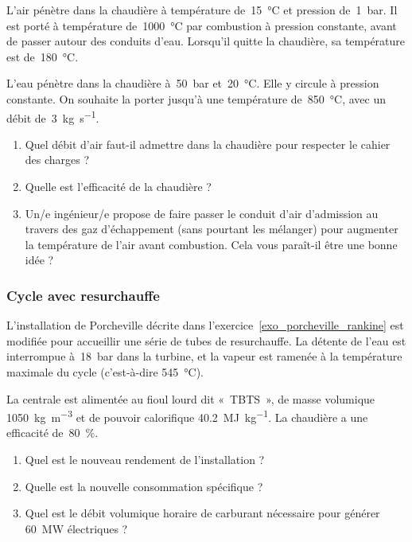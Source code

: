 	L’air pénètre dans la chaudière à température de~\SI{15}{\degreeCelsius} et pression de~\SI{1}{\bar}. Il est porté à température de~\SI{1000}{\degreeCelsius} par combustion à pression constante, avant de passer autour des conduits d’eau.	Lorsqu’il quitte la chaudière, sa température est de~\SI{180}{\degreeCelsius}.

	L’eau pénètre dans la chaudière à~\SI{50}{\bar} et~\SI{20}{\degreeCelsius}. Elle y circule à pression constante. On souhaite la porter jusqu’à une température de~\SI{850}{\degreeCelsius}, avec un débit de~\SI{3}{\kilogram\per\second}.
	
	\begin{enumerate}
		\item Quel débit d’air faut-il admettre dans la chaudière pour respecter le cahier des charges ?
		\item Quelle est l’efficacité de la chaudière ?
		\item Un/e ingénieur/e propose de faire passer le conduit d’air d’admission au travers des gaz d’échappement (sans pourtant les mélanger) pour augmenter la température de l’air avant combustion. Cela vous paraît-il être une bonne idée ?
	\end{enumerate}


\subsubsection{Cycle avec resurchauffe}

	L’installation de Porcheville décrite dans l’exercice~\ref{exo_porcheville_rankine} est modifiée pour accueillir une série de tubes de resurchauffe. La détente de l’eau est interrompue à~\SI{18}{\bar} dans la turbine, et la vapeur est ramenée à la température maximale du cycle (c’est-à-dire \SI{545}{\degreeCelsius}).
	
	La centrale est alimentée au fioul lourd dit «~TBTS~», de masse volumique \SI{1050}{\kilogram\per\metre\cubed} et de pouvoir calorifique \SI{40,2}{\mega\joule\per\kilogram}. La chaudière a une efficacité de~\SI{80}{\percent}.
	
	\begin{enumerate}
		\item Quel est le nouveau rendement de l’installation ?
		\item Quelle est la nouvelle consommation spécifique ?
		\item Quel est le débit volumique horaire de carburant nécessaire pour générer \SI{60}{\mega\watt} électriques ?
	\end{enumerate}
	

